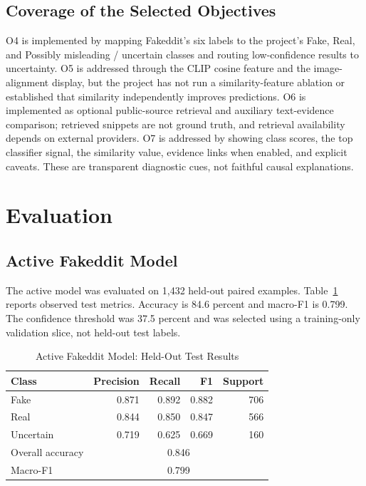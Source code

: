 \documentclass[conference]{IEEEtran}
\begin{document}
\subsection{Coverage of the Selected Objectives}
O4 is implemented by mapping Fakeddit's six labels to the project's Fake, Real, and Possibly misleading / uncertain classes and routing low-confidence results to uncertainty. O5 is addressed through the CLIP cosine feature and the image-alignment display, but the project has not run a similarity-feature ablation or established that similarity independently improves predictions. O6 is implemented as optional public-source retrieval and auxiliary text-evidence comparison; retrieved snippets are not ground truth, and retrieval availability depends on external providers. O7 is addressed by showing class scores, the top classifier signal, the similarity value, evidence links when enabled, and explicit caveats. These are transparent diagnostic cues, not faithful causal explanations.

\section{Evaluation}
\subsection{Active Fakeddit Model}
The active model was evaluated on 1,432 held-out paired examples. Table~\ref{tab:fakeddit} reports observed test metrics. Accuracy is 84.6 percent and macro-F1 is 0.799. The confidence threshold was 37.5 percent and was selected using a training-only validation slice, not held-out test labels.

\begin{table}[t]
\caption{Active Fakeddit Model: Held-Out Test Results}
\label{tab:fakeddit}
\centering
\begin{tabular}{lrrrr}
\hline
Class & Precision & Recall & F1 & Support\\
\hline
Fake & 0.871 & 0.892 & 0.882 & 706\\
Real & 0.844 & 0.850 & 0.847 & 566\\
Uncertain & 0.719 & 0.625 & 0.669 & 160\\
\hline
Overall accuracy & \multicolumn{4}{c}{0.846}\\
Macro-F1 & \multicolumn{4}{c}{0.799}\\
\hline
\end{tabular}
\end{table}
\end{document}
